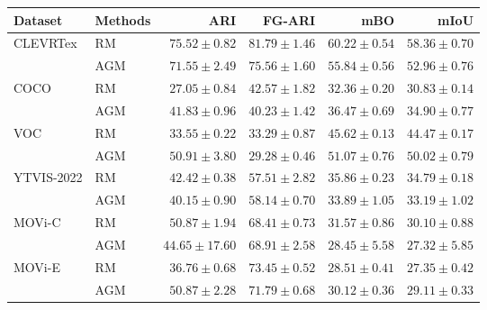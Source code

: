 \begin{tabular}{llrrrr}
\toprule
Dataset & Methods & ARI & FG-ARI & mBO & mIoU \\
\midrule
CLEVRTex & RM & $75.52\pm0.82$ & $81.79\pm1.46$ & $60.22\pm0.54$ & $58.36\pm0.70$ \\
& AGM& $71.55\pm2.49$ & $75.56\pm1.60$ & $55.84\pm0.56$ & $52.96\pm0.76$ \\
\midrule
COCO & RM & $27.05\pm0.84$ & $42.57\pm1.82$ & $32.36\pm0.20$ & $30.83\pm0.14$ \\
& AGM& $41.83\pm0.96$ & $40.23\pm1.42$ & $36.47\pm0.69$ & $34.90\pm0.77$ \\
\midrule
VOC & RM & $33.55\pm0.22$ & $33.29\pm0.87$ & $45.62\pm0.13$ & $44.47\pm0.17$ \\
& AGM& $50.91\pm3.80$ & $29.28\pm0.46$ & $51.07\pm0.76$ & $50.02\pm0.79$ \\
\midrule
YTVIS-2022 & RM & $42.42\pm0.38$ & $57.51\pm2.82$ & $35.86\pm0.23$ & $34.79\pm0.18$ \\
& AGM& $40.15\pm0.90$ & $58.14\pm0.70$ & $33.89\pm1.05$ & $33.19\pm1.02$ \\
\midrule
MOVi-C & RM & $50.87\pm1.94$ & $68.41\pm0.73$ & $31.57\pm0.86$ & $30.10\pm0.88$ \\
& AGM& $44.65\pm17.60$ & $68.91\pm2.58$ & $28.45\pm5.58$ & $27.32\pm5.85$ \\
\midrule
MOVi-E & RM & $36.76\pm0.68$ & $73.45\pm0.52$ & $28.51\pm0.41$ & $27.35\pm0.42$ \\
& AGM & $50.87\pm2.28$ & $71.79\pm0.68$ & $30.12\pm0.36$ & $29.11\pm0.33$ \\
\bottomrule
\end{tabular}